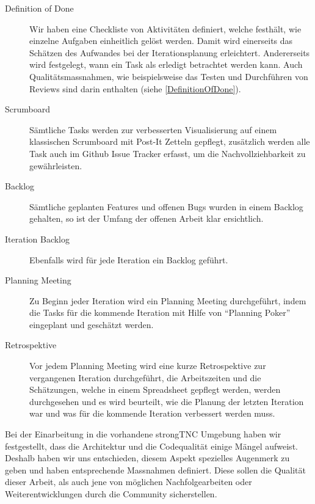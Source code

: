 \begin{description}
	\item[Definition of Done] Wir haben eine Checkliste von Aktivitäten	definiert,
	welche festhält, wie einzelne Aufgaben einheitlich gelöst werden. Damit wird
	einerseits das Schätzen des Aufwandes bei der Iterationsplanung erleichtert.
	Andererseits wird festgelegt, wann ein Task als erledigt betrachtet werden kann.
	Auch Qualitätsmassnahmen, wie beispielsweise das Testen und Durchführen von
	Reviews sind darin enthalten (siehe \autoref{DefinitionOfDone}).

	\item[Scrumboard] Sämtliche Tasks werden zur verbesserten Visualisierung auf
	einem klassischen Scrumboard mit Post-It Zetteln gepflegt, zusätzlich werden
	alle Task auch im Github Issue Tracker erfasst, um die Nachvollziehbarkeit
	zu gewährleisten.
	
	\item[Backlog] Sämtliche geplanten Features und offenen Bugs wurden in einem
	Backlog gehalten, so ist der Umfang der offenen Arbeit klar ersichtlich.
	
	\item[Iteration Backlog] Ebenfalls wird für jede Iteration ein Backlog
	geführt.
	
	\item[Planning Meeting] Zu Beginn jeder Iteration wird ein Planning Meeting
	durchgeführt, indem die Tasks für die kommende Iteration mit Hilfe von
	\enquote{Planning Poker} eingeplant und geschätzt werden.
		
	\item[Retrospektive] Vor jedem Planning Meeting wird eine kurze Retrospektive
	zur vergangenen Iteration durchgeführt, die Arbeitszeiten und die Schätzungen,
	welche in einem Spreadsheet gepflegt werden, werden durchgesehen und es wird
	beurteilt, wie die Planung der letzten Iteration war und was für die kommende
	Iteration verbessert werden muss.
	
\end{description}

Bei der Einarbeitung in die vorhandene strongTNC Umgebung haben wir
festgestellt, dass die Architektur und die Codequalität einige Mängel aufweist.
Deshalb haben wir uns entschieden, diesem Aspekt spezielles Augenmerk zu geben
und haben entsprechende Massnahmen definiert. Diese sollen die Qualität dieser
Arbeit, als auch jene von möglichen Nachfolgearbeiten oder Weiterentwicklungen
durch die Community sicherstellen.

